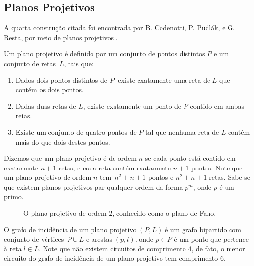 \subsection{Planos Projetivos}

A quarta construção citada foi encontrada por B. Codenotti, P. Pudlák, e G. Resta, por meio de planos projetivos \cite{codenotti2000some}.

Um plano projetivo é definido por um conjunto de pontos distintos $P$  e um conjunto de retas~$L$, tais que:

\begin{enumerate}
\item Dados dois pontos distintos de $P$, existe exatamente uma reta de $L$ que contém os dois pontos. 
\item Dadas duas retas de $L$, existe exatamente um ponto de $P$ contido em ambas retas.
\item Existe um conjunto de quatro pontos de $P$ tal que nenhuma reta de $L$ contém mais do que dois destes pontos.
\end{enumerate}

Dizemos que um plano projetivo é de ordem $n$ se cada ponto está contido em exatamente $n+1$ retas, e cada reta contém exatamente $n+1$ pontos. Note que um plano projetivo de ordem $n$ tem~$n^2 + n + 1$ pontos e $n^2 + n + 1$ retas. Sabe-se que existem planos projetivos par qualquer ordem da forma $p^m$, onde $p$ é um primo.

\begin{figure}[H]
\centering
{}
\caption{O plano projetivo de ordem $2$, conhecido como o plano de Fano.}
\label{fig:fanoexample}
\end{figure}

O grafo de incidência de um plano projetivo $(P,L)$ é um grafo bipartido com conjunto de vértices~$P \cup L$ e arestas $(p,l)$, onde $p\in P$ é um ponto que pertence à reta $l \in L$. Note que não existem circuitos de comprimento $4$, de fato, o menor circuito do grafo de incidência de um plano projetivo tem comprimento $6$.

